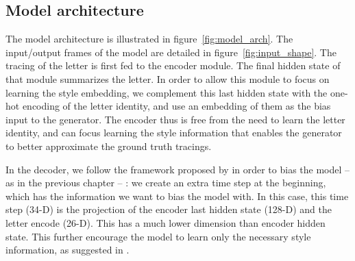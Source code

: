   \subsection{Model architecture}
     \par The model architecture is illustrated in figure~\ref{fig:model_arch}. The input/output frames of the model are detailed in figure~\ref{fig:input_shape}. The tracing of the letter is first fed to the encoder module. The final hidden state of that module summarizes the letter. In order to allow this module to focus on learning the style embedding, we complement this last hidden state with the one-hot encoding of the letter identity, and use an embedding of them as the bias input to the generator. The encoder thus is free from the need to learn the letter identity, and can focus learning the style information that enables the generator to better approximate the ground truth tracings.

    \par In the decoder, we follow the framework proposed by \cite{vinyals2015show} in order to bias the model -- as in the previous chapter -- : we create an extra time step at the beginning, which has the information we want to bias the model with. In this case, this time step (34-D) is the projection of the encoder last hidden state (128-D) and the letter encode (26-D). This has a much lower dimension than encoder hidden state. This further encourage the model to learn only the necessary style information, as suggested in \cite{DBLP:journals/corr/abs-1803-09047}.

